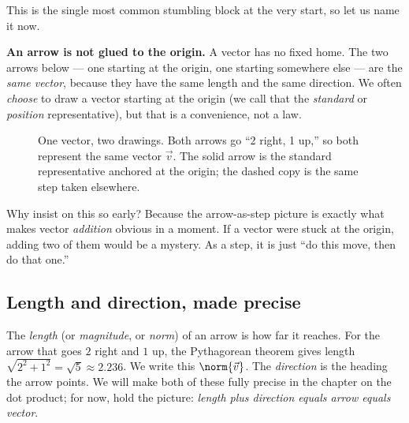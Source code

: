 This is the single most common stumbling block at the very start, so let us name it now.

\begin{trapbox}
\textbf{An arrow is not glued to the origin.} A vector has no fixed home. The two arrows
below --- one starting at the origin, one starting somewhere else --- are the \emph{same
vector}, because they have the same length and the same direction. We often \emph{choose}
to draw a vector starting at the origin (we call that the \emph{standard} or
\emph{position} representative), but that is a convenience, not a law.
\end{trapbox}

\begin{figure}[H]
\centering
{}
\caption{One vector, two drawings. Both arrows go ``2 right, 1 up,'' so both represent
the same vector $\vec{v}$. The solid arrow is the standard representative anchored at the
origin; the dashed copy is the same step taken elsewhere.}
\label{ch02:fig-translate}
\end{figure}

Why insist on this so early? Because the arrow-as-step picture is exactly what makes
vector \emph{addition} obvious in a moment. If a vector were stuck at the origin, adding
two of them would be a mystery. As a step, it is just ``do this move, then do that one.''

\subsection*{Length and direction, made precise}

The \emph{length} (or \emph{magnitude}, or \emph{norm}) of an arrow is how far it
reaches. For the arrow that goes $2$ right and $1$ up, the Pythagorean theorem gives
length $\sqrt{2^2 + 1^2} = \sqrt{5} \approx 2.236$. We write this $\norm{\vec{v}}$. The
\emph{direction} is the heading the arrow points. We will make both of these fully
precise in the chapter on the dot product; for now, hold the picture: \emph{length plus
direction equals arrow equals vector}.

